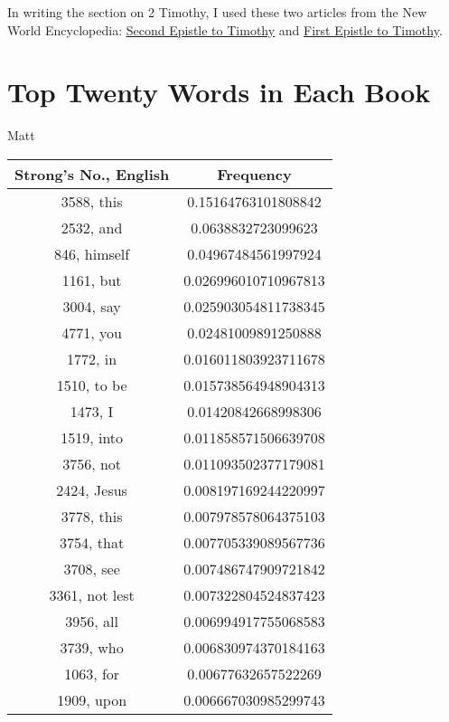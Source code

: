 \documentclass[12pt,letterpaper]{article}
\begin{document}
In writing the section on 2 Timothy, I used these two articles from the New World Encyclopedia: \underline{\href{https://www.newworldencyclopedia.org/entry/Second_Epistle_to_Timothy}{Second Epistle to Timothy}} and \underline{\href{https://www.newworldencyclopedia.org/entry/First_Epistle_to_Timothy}{First Epistle to Timothy}}.  

\newpage 

\appendix
\section{Top Twenty Words in Each Book}

Matt


 \begin{longtable}{|c|c|}
\hline
 Strong's No., English & Frequency \\ \hline  
3588, this & 0.15164763101808842\\ \hline 
 2532, and & 0.0638832723099623\\ \hline 
 846, himself & 0.04967484561997924\\ \hline 
 1161, but & 0.026996010710967813\\ \hline 
 3004, say & 0.025903054811738345\\ \hline 
 4771, you & 0.02481009891250888\\ \hline 
 1772, in & 0.016011803923711678\\ \hline 
 1510, to be & 0.015738564948904313\\ \hline 
 1473, I & 0.01420842668998306\\ \hline 
 1519, into & 0.011858571506639708\\ \hline 
 3756, not & 0.011093502377179081\\ \hline 
 2424, Jesus & 0.008197169244220997\\ \hline 
 3778, this & 0.007978578064375103\\ \hline 
 3754, that & 0.007705339089567736\\ \hline 
 3708, see & 0.007486747909721842\\ \hline 
 3361, not lest & 0.007322804524837423\\ \hline 
 3956, all & 0.006994917755068583\\ \hline 
 3739, who & 0.006830974370184163\\ \hline 
 1063, for & 0.00677632657522269\\ \hline 
 1909, upon & 0.006667030985299743\\ \hline 
\end{longtable} 
 
\end{document}
